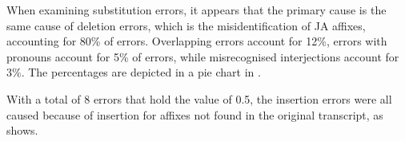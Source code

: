 \documentclass[english]{textolivre}
\begin{document}
When examining substitution errors, it appears that the primary cause is
the same cause of deletion errors, which is the misidentification of JA
affixes, accounting for 80\% of errors. Overlapping errors account for
12\%, errors with pronouns account for 5\% of errors, while
misrecognised interjections account for 3\%. The percentages are
depicted in a pie chart in .
	

With a total of 8 errors that hold the value of 0.5, the insertion
errors were all caused because of insertion for affixes not found in the
original transcript, as  shows.

\end{document}
